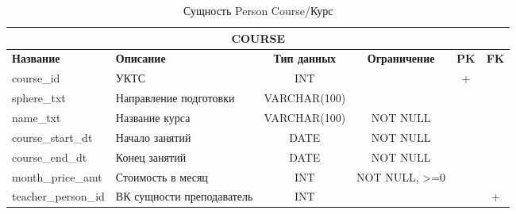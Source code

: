 \documentclass[a4paper]{article}
\begin{document}
\begin{table}[!hbt]
\begin{tabularx}{\textwidth}{|l|X|c|c|c|c|}
\hline
\multicolumn{6}{|c|}{\textbf{COURSE}}                                                                                    \\ \hline
\textbf{Название}   & \textbf{Описание}         & \textbf{Тип данных} & \textbf{Ограничение} & \textbf{PK} & \textbf{FK} \\ \hline
course\_id          & УКТС          & INT                 &                      & +           &             \\ \hline
sphere\_txt         & Направление подготовки    & VARCHAR(100)        &                      &             &             \\ \hline
name\_txt           & Название курса            & VARCHAR(100)        & NOT NULL             &             &             \\ \hline
course\_start\_dt   & Начало занятий            & DATE        &         NOT NULL             &             &             \\ \hline
course\_end\_dt     & Конец занятий             & DATE                 &       NOT NULL               &             &             \\ \hline
month\_price\_amt & Стоимость в месяц & INT                 &     NOT NULL, >=0                 &             &           \\ \hline
teacher\_person\_id & ВК сущности преподаватель & INT                 &                      &             & +           \\ \hline

\end{tabularx}
\caption{Сущность Person Course/Курс}
\end{table}
\end{document}
